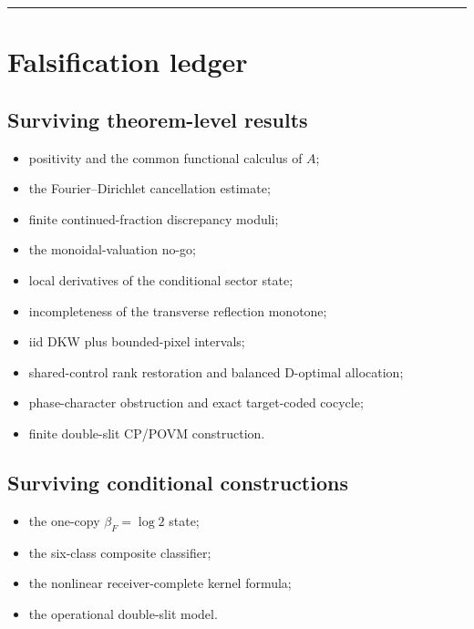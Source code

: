 \documentclass[11pt,a4paper,openany]{report}
\begin{document}
\par\medskip\hrule\medskip

\chapter{Falsification ledger}

\section{Surviving theorem-level results}

\begin{itemize}
\item 
positivity and the common functional calculus of \(A\);

\item 
the Fourier--Dirichlet cancellation estimate;

\item 
finite continued-fraction discrepancy moduli;

\item 
the monoidal-valuation no-go;

\item 
local derivatives of the conditional sector state;

\item 
incompleteness of the transverse reflection monotone;

\item 
iid DKW plus bounded-pixel intervals;

\item 
shared-control rank restoration and balanced D-optimal allocation;

\item 
phase-character obstruction and exact target-coded cocycle;

\item 
finite double-slit CP/\allowbreak{}POVM construction.

\end{itemize}

\section{Surviving conditional constructions}

\begin{itemize}
\item 
the one-copy \(\beta_F=\log2\) state;

\item 
the six-class composite classifier;

\item 
the nonlinear receiver-complete kernel formula;

\item 
the operational double-slit model.

\end{itemize}
\end{document}
